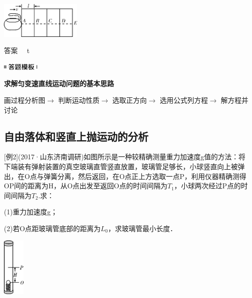 \begin{center}\includegraphics[width=1.55556in,height=0.69444in]{media/image24.png}\end{center}

\begin{solution}
	答案　 t
\end{solution}
\begin{center}\includegraphics[width=0.71319in,height=0.12986in]{media/image25.png}

\textbf{求解匀变速直线运动问题的基本思路}
\end{center}


画过程分析图$\rightarrow$ 判断运动性质$\rightarrow$ 选取正方向$\rightarrow$ 选用公式列方程$\rightarrow$ 解方程并讨论

\newpage
\subsection{自由落体和竖直上抛运动的分析}

{[}例2{]}(2017·山东济南调研)如图所示是一种较精确测量重力加速度g值的方法：将下端装有弹射装置的真空玻璃直管竖直放置，玻璃管足够长，小球竖直向上被弹出，在O点与弹簧分离，然后返回，在O点正上方选取一点P，利用仪器精确测得OP间的距离为H，从O点出发至返回O点的时间间隔为$T_1$，小球两次经过P点的时间间隔为$T_2$.求：

(1)重力加速度g；

(2)若O点距玻璃管底部的距离为$L_0$，求玻璃管最小长度．

\begin{center}\includegraphics[width=0.41667in,height=1.13889in]{media/image26.png}\end{center}

